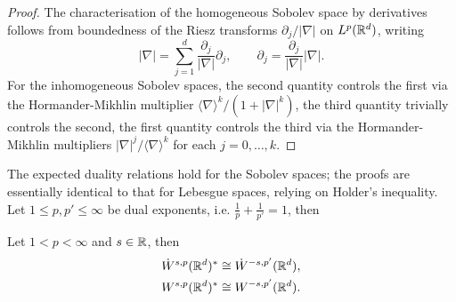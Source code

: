 \begin{proof}
	The characterisation of the homogeneous Sobolev space by derivatives follows from boundedness of the Riesz transforms $\partial_j/|\nabla|$ on $L^p (\mathbb R^d)$, writing 
		\[ |\nabla| = \sum_{j = 1}^d \frac{\partial_j}{|\nabla|} \partial_j , \qquad \partial_j = \frac{\partial_j}{|\nabla|} |\nabla|. \]
	For the inhomogeneous Sobolev spaces, the second quantity controls the first via the Hormander-Mikhlin multiplier $\langle \nabla \rangle^k /(1 + |\nabla|^k)$, the third quantity trivially controls the second, the first quantity controls the third via the Hormander-Mikhlin multipliers $|\nabla|^j/\langle \nabla \rangle^k$ for each $j = 0, \dots, k$.  
\end{proof}

The expected duality relations hold for the Sobolev spaces; the proofs are essentially identical to that for Lebesgue spaces, relying on Holder's inequality. Let $1 \leq p, p' \leq \infty$ be dual exponents, i.e.  $\tfrac1p + \tfrac{1}{p'} = 1$, then 

\begin{theorem}[Duality]
	Let $1 < p < \infty$ and $s \in \mathbb R$, then 
		\begin{align*}
			\dot W^{s, p} (\mathbb R^d)^* 
				&\cong \dot W^{-s, p'} (\mathbb R^d), \\
			W^{s, p} (\mathbb R^d)^* 
				&\cong  W^{-s, p'} (\mathbb R^d).
		\end{align*}
\end{theorem}



